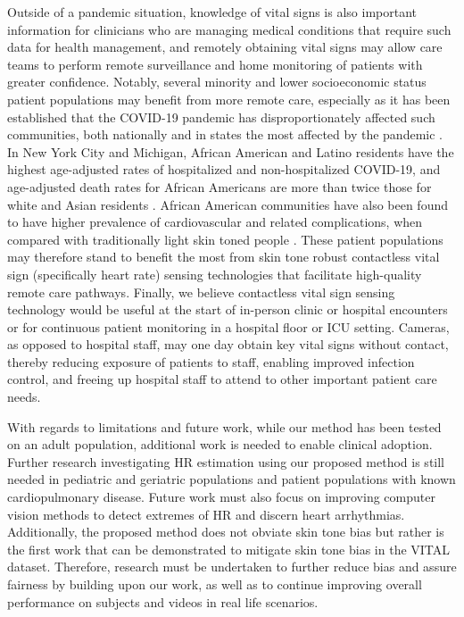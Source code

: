 Outside of a pandemic situation, knowledge of vital signs is also important information for clinicians who are managing medical conditions that require such data for health management, and remotely obtaining vital signs may allow care teams to perform remote surveillance and home monitoring of patients with greater confidence. Notably, several minority and lower socioeconomic status patient populations may benefit from more remote care, especially as it has been established that the COVID-19 pandemic has disproportionately affected such communities, both nationally and in states the most affected by the pandemic \cite{abedi_racial_2020,azar_disparities_2020}. In New York City and Michigan, African American and Latino residents have the highest age-adjusted rates of hospitalized and non-hospitalized COVID-19, and age-adjusted death rates for African Americans are more than twice those for white and Asian residents \cite{holtgrave_assessing_2020,gu_characteristics_2020}. African American communities have also been found to have higher prevalence of cardiovascular and related complications, when compared with traditionally light skin toned people \cite{mensah_cardiovascular_2018}. These patient populations may therefore stand to benefit the most from skin tone robust contactless vital sign (specifically heart rate) sensing technologies that facilitate high-quality remote care pathways. Finally, we believe contactless vital sign sensing technology would be useful at the start of in-person clinic or hospital encounters or for continuous patient monitoring in a hospital floor or ICU setting. Cameras, as opposed to hospital staff, may one day obtain key vital signs without contact, thereby reducing exposure of patients to staff, enabling improved infection control, and freeing up hospital staff to attend to other important patient care needs.  

With regards to limitations and future work, while our method has been tested on an adult population, additional work is needed to enable clinical adoption.  Further research investigating HR estimation using our proposed method is still needed in pediatric and geriatric populations and patient populations with known cardiopulmonary disease. Future work must also focus on improving computer vision methods to detect extremes of HR and discern heart arrhythmias. Additionally, the proposed method does not obviate skin tone bias but rather is the first work that can be demonstrated to mitigate skin tone bias in the VITAL dataset. Therefore, research must be undertaken to further reduce bias and assure fairness by building upon our work, as well as to continue improving overall performance on subjects and videos in real life scenarios. 
 
